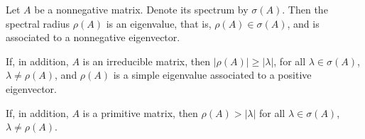 \documentclass[12pt]{article}
\begin{document}
Let $A$ be a nonnegative matrix. Denote its spectrum by $\sigma(A)$.
Then the spectral radius $\rho(A)$ is an eigenvalue, that is, $\rho(A)\in \sigma(A)$, and is associated to a nonnegative eigenvector.

If, in addition, $A$ is an irreducible matrix, then $|\rho(A)|\geq |\lambda|$, for all $\lambda\in \sigma(A)$, $\lambda\neq \rho(A)$, and $\rho(A)$ is a simple eigenvalue associated to a positive eigenvector.

If, in addition, $A$ is a primitive matrix, then $\rho(A)>|\lambda|$ for all $\lambda\in\sigma(A)$, $\lambda\neq\rho(A)$.
\end{document}
